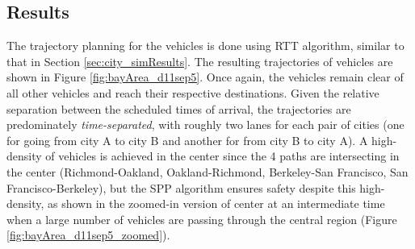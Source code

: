 \subsection{Results \label{sec:bayArea_simResults}}
The trajectory planning for the vehicles is done using RTT algorithm, similar to that in Section \ref{sec:city_simResults}. The resulting trajectories of vehicles are shown in Figure \ref{fig:bayArea_d11sep5}. Once again, the vehicles remain clear of all other vehicles and reach their respective destinations. Given the relative separation between the scheduled times of arrival, the trajectories are predominately \textit{time-separated}, with roughly two lanes for each pair of cities (one for going from city A to city B and another for from city B to city A). A high-density of vehicles is achieved in the center since the 4 paths are intersecting in the center (Richmond-Oakland, Oakland-Richmond, Berkeley-San Francisco, San Francisco-Berkeley), but the SPP algorithm ensures safety despite this high-density, as shown in the zoomed-in version of center at an intermediate time when a large number of vehicles are passing through the central region (Figure \ref{fig:bayArea_d11sep5_zoomed}).  
%
